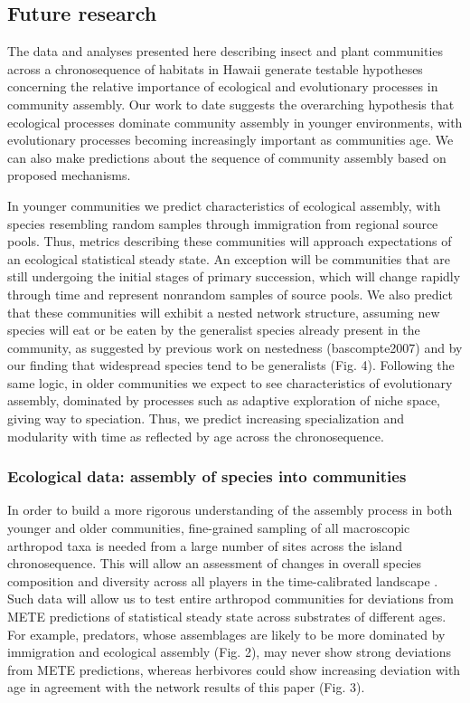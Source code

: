 \subsection{Future research}

The data and analyses presented here describing insect and plant
communities across a chronosequence of habitats in Hawaii generate
testable hypotheses concerning the relative importance of ecological
and evolutionary processes in community assembly. Our work to date
suggests the overarching hypothesis that ecological processes dominate
community assembly in younger environments, with evolutionary
processes becoming increasingly important as communities age. We can
also make predictions about the sequence of community assembly based
on proposed mechanisms.

In younger communities we predict characteristics of ecological
assembly, with species resembling random samples through immigration
from regional source pools. Thus, metrics describing these communities
will approach expectations of an ecological statistical steady
state. An exception will be communities that are still undergoing the
initial stages of primary succession, which will change rapidly
through time and represent nonrandom samples of source pools. We also
predict that these communities will exhibit a nested network
structure, assuming new species will eat or be eaten by the generalist
species already present in the community, as suggested by previous
work on nestedness (bascompte2007) and by our finding that widespread
species tend to be generalists (Fig. 4).  Following the same logic, in
older communities we expect to see characteristics of evolutionary
assembly, dominated by processes such as adaptive exploration of niche
space, giving way to speciation. Thus, we predict increasing
specialization and modularity with time \citep{bascompte2007,
donatti2011, nuismer2013} as reflected by age across the
chronosequence.


\subsubsection{Ecological data: assembly of species into communities}

In order to build a more rigorous understanding of the assembly
process in both younger and older communities, fine-grained sampling
of all macroscopic arthropod taxa is needed from a large number of
sites across the island chronosequence. This will allow an assessment
of changes in overall species composition and diversity across all
players in the time-calibrated landscape \citep{gruner2007}. Such data
will allow us to test entire arthropod communities for deviations from
METE predictions of statistical steady state \citep{harte2011} across
substrates of different ages. For example, predators, whose
assemblages are likely to be more dominated by immigration and
ecological assembly (Fig. 2), may never show strong deviations from
METE predictions, whereas herbivores could show increasing deviation
with age in agreement with the network results of this paper (Fig. 3).


